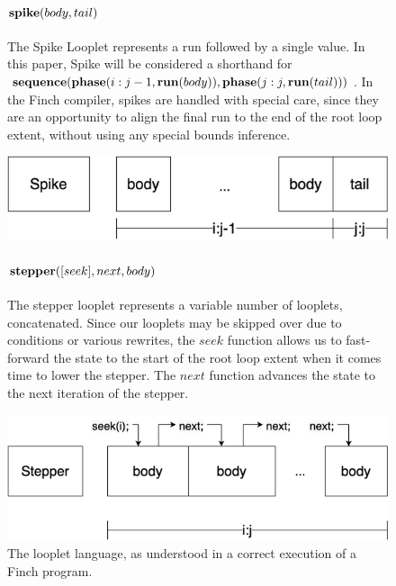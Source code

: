 \begin{figure}[ht]
\begin{minipage}[c]{0.6\linewidth}
        \paragraph{$\text{\textbf{spike}}(body, tail)$} The Spike Looplet represents a run
        followed by a single value. In this paper, Spike will be considered a
        shorthand for $\text{\textbf{sequence}}(\text{\textbf{phase}}(i:j-1, \text{\textbf{run}}(body)),
        \text{\textbf{phase}}(j:j, \text{\textbf{run}}(tail)))$.  In the Finch compiler, spikes are
        handled with special care, since they are an opportunity to align the
        final run to the end of the root loop extent, without using any special
        bounds inference.
    \end{minipage}%
    \begin{minipage}[c]{0.4\linewidth}
        \centering
        \includegraphics[scale=0.25]{Looplets-spike.png}
    \end{minipage}

    \begin{minipage}[c]{0.6\linewidth}
        \paragraph{$\text{\textbf{stepper}}([seek], next, body)$} The stepper looplet
        represents a variable number of looplets, concatenated. Since our
        looplets may be skipped over due to conditions or various rewrites, the
        $seek$ function allows us to fast-forward the state to the start of the
        root loop extent when it comes time to lower the stepper. The $next$
        function advances the state to the next iteration of the stepper. 
    \end{minipage}%
    \begin{minipage}[c]{0.4\linewidth}
        \centering
        \includegraphics[scale=0.25]{Looplets-stepper.png}
    \end{minipage}
    \caption{The looplet language, as understood in a correct execution of a Finch program.}
\end{figure}